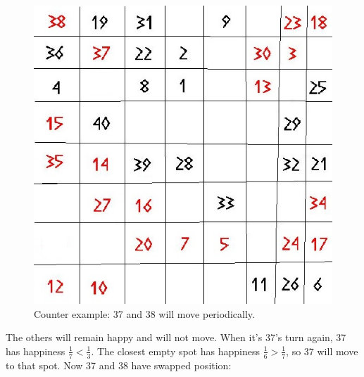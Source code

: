 \begin{figure}[h!]
\begin{center}
\includegraphics[scale=0.25]{Tegenvoorbeeld/segregation_tegenvb_2.jpg}
\end{center}
\caption{Counter example: 37 and 38 will move periodically.}\label{counterexample2}
\end{figure}
\newpage
The others will remain happy and will not move. When it's 37's turn again, 37 has happiness $\frac{1}{7} < \frac{1}{3}$. The closest empty spot has happiness $\frac{1}{6} > \frac{1}{7}$, so 37 will move to that spot. Now 37 and 38 have swapped position:\\
